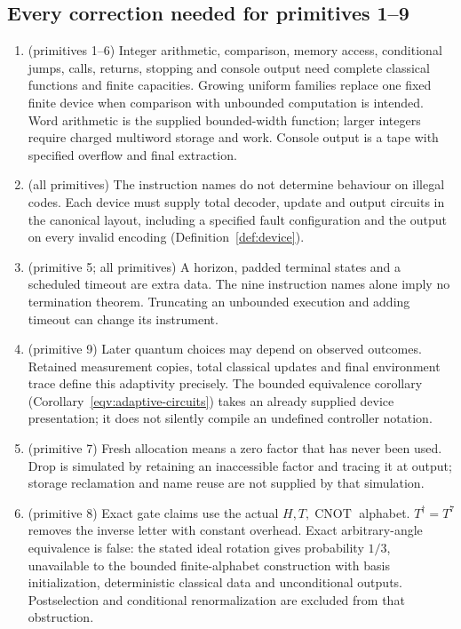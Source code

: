 \subsection{Every correction needed for primitives 1--9}
\begin{enumerate}
\item (primitives 1--6) Integer arithmetic, comparison, memory access, conditional jumps, calls, returns, stopping and console output need complete classical functions and finite capacities. Growing uniform families replace one fixed finite device when comparison with unbounded computation is intended. Word arithmetic is the supplied bounded-width function; larger integers require charged multiword storage and work. Console output is a tape with specified overflow and final extraction.
\item (all primitives) The instruction names do not determine behaviour on
illegal codes. Each device must supply total decoder, update and output
circuits in the canonical layout, including a specified fault configuration
and the output on every invalid encoding (Definition~\ref{def:device}).
\item (primitive 5; all primitives) A horizon, padded terminal states and a scheduled timeout are extra data. The nine instruction names alone imply no termination theorem. Truncating an unbounded execution and adding timeout can change its instrument.
\item (primitive 9) Later quantum choices may depend on observed outcomes. Retained measurement copies, total classical updates and final environment trace define this adaptivity precisely. The bounded equivalence corollary (Corollary~\ref{eqv:adaptive-circuits}) takes an already supplied device presentation; it does not silently compile an undefined controller notation.
\item (primitive 7) Fresh allocation means a zero factor that has never been used. Drop is simulated by retaining an inaccessible factor and tracing it at output; storage reclamation and name reuse are not supplied by that simulation.
\item (primitive 8) Exact gate claims use the actual $H,T,\operatorname{CNOT}$ alphabet. $T^\dagger=T^7$ removes the inverse letter with constant overhead. Exact arbitrary-angle equivalence is false: the stated ideal rotation gives probability $1/3$, unavailable to the bounded finite-alphabet construction with basis initialization, deterministic classical data and unconditional outputs. Postselection and conditional renormalization are excluded from that obstruction.

\end{enumerate}
